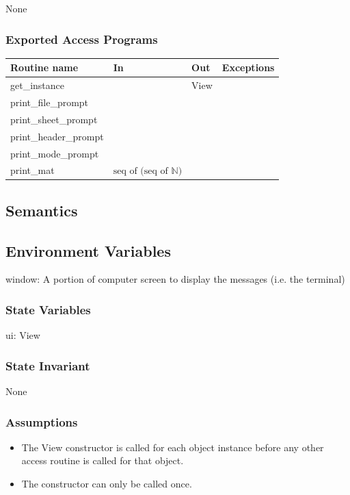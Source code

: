 \documentclass[12pt]{article}
\begin{document}
None

\subsubsection* {Exported Access Programs}

\begin{tabular}{| l | l | l | p{5cm} |}
  \hline
  \textbf{Routine name} & \textbf{In} & \textbf{Out} & \textbf{Exceptions}\\
  \hline
  get\_instance &  & View & \\
  \hline
  print\_file\_prompt & &  & \\
  \hline
  print\_sheet\_prompt & & & \\
  \hline
  print\_header\_prompt & & & \\
  \hline
  print\_mode\_prompt & & & \\
  \hline
  print\_mat & $\text{seq of (seq of } \mathbb{N} \text{)}$ & & \\
  \hline

\end{tabular}

\subsection* {Semantics}

\subsection*{Environment Variables}

window: A portion of computer screen to display the messages (i.e. the terminal)

\subsubsection* {State Variables}

ui: View

\subsubsection* {State Invariant}

None

\subsubsection* {Assumptions}

\begin{itemize}
  \item The View constructor is called for each object instance before any 
  other access routine is called for that object.  
  \item The constructor can only be called once.
\end{itemize}
\end{document}

